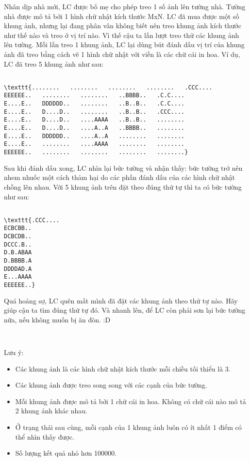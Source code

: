 Nhân dịp nhà mới, LC được bố mẹ cho phép treo 1 số ảnh lên tường nhà. Tường nhà được mô tả bởi 1 hình chữ nhật kích thước MxN. LC đã mua được một số khung ảnh, nhưng lại đang phân vân không biết nên treo khung ảnh kích thước như thế nào và treo ở vị trí nào. Vì thế cậu ta lần lượt treo thử các khung ảnh lên tường. Mỗi lần treo 1 khung ảnh, LC lại dùng bút đánh dấu vị trí của khung ảnh đã treo bằng cách vẽ 1 hình chữ nhật với viền là các chữ cái in hoa. Ví dụ, LC đã treo 5 khung ảnh như sau:
\begin{verbatim}

\texttt{........   ........   ........   ........   .CCC....
EEEEEE..   ........   ........   ..BBBB..   .C.C....
E....E..   DDDDDD..   ........   ..B..B..   .C.C....
E....E..   D....D..   ........   ..B..B..   .CCC....
E....E..   D....D..   ....AAAA   ..B..B..   ........
E....E..   D....D..   ....A..A   ..BBBB..   ........
E....E..   DDDDDD..   ....A..A   ........   ........
E....E..   ........   ....AAAA   ........   ........
EEEEEE..   ........   ........   ........   ........}\end{verbatim}

Sau khi đánh dấu xong, LC nhìn lại bức tường và nhận thấy: bức tường trở nên nhem nhuốc một cách thảm hại do các phần đánh dấu của các hình chữ nhật chồng lên nhau. Với 5 khung ảnh trên đặt theo đúng thứ tự thì ta có bức tường như sau:
\begin{verbatim}

\texttt{.CCC....
ECBCBB..
DCBCDB..
DCCC.B..
D.B.ABAA
D.BBBB.A
DDDDAD.A
E...AAAA
EEEEEE..}\end{verbatim}

Quá hoảng sợ, LC quên mất mình đã đặt các khung ảnh theo thứ tự nào. Hãy giúp cậu ta tìm đúng thứ tự đó. Và nhanh lên, để LC còn phải sơn lại bức tường nữa, nếu không muốn bị ăn đòn. :D

 

Lưu ý:
\begin{itemize}
	\item Các khung ảnh là các hình chữ nhật kích thước mỗi chiều tối thiểu là 3.
	\item Các khung ảnh được treo song song với các cạnh của bức tường.
	\item Mỗi khung ảnh được mô tả bởi 1 chữ cái in hoa. Không có chữ cái nào mô tả 2 khung ảnh khác nhau.
	\item Ở trạng thái sau cùng, mỗi cạnh của 1 khung ảnh luôn có ít nhất 1 điểm có thể nhìn thấy được.
	\item Số lượng kết quả nhỏ hơn 100000.
\end{itemize}